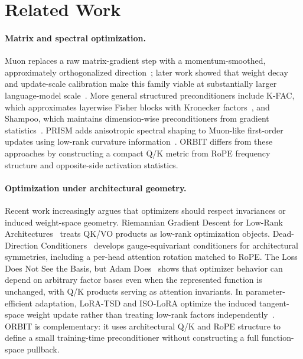 \documentclass[10pt]{article}
\begin{document}
\section{Related Work}
\paragraph{Matrix and spectral optimization.}
Muon replaces a raw matrix-gradient step with a momentum-smoothed, approximately
orthogonalized direction~\cite{jordan2024muon}; later work showed that weight decay and
update-scale calibration make this family viable at substantially larger language-model
scale~\cite{liu2025muon}. More general structured preconditioners include K-FAC, which
approximates layerwise Fisher blocks with Kronecker factors~\cite{martens2015kfac}, and
Shampoo, which maintains dimension-wise preconditioners from gradient statistics~\cite{gupta2018shampoo}.
PRISM adds anisotropic spectral shaping to Muon-like first-order updates using low-rank
curvature information~\cite{yang2026prism}. ORBIT differs from these approaches by
constructing a compact Q/K metric from RoPE frequency structure and opposite-side activation
statistics.

\paragraph{Optimization under architectural geometry.}
Recent work increasingly argues that optimizers should respect invariances or induced
weight-space geometry. Riemannian Gradient Descent for Low-Rank Architectures~\cite{knight2026riemannian}
treats QK/VO products as low-rank optimization objects. Dead-Direction Conditioners~\cite{shirodkar2026dead}
develops gauge-equivariant conditioners for architectural symmetries, including a per-head
attention rotation matched to RoPE. The Loss Does Not See the Basis, but Adam Does~\cite{singh2026basis}
shows that optimizer behavior can depend on arbitrary factor bases even when the represented
function is unchanged, with Q/K products serving as attention invariants. In parameter-efficient
adaptation, LoRA-TSD and ISO-LoRA optimize the induced tangent-space weight update rather
than treating low-rank factors independently~\cite{andriianov2026loratsd,zhu2026isolora}.
ORBIT is complementary: it uses architectural Q/K and RoPE structure to define a small
training-time preconditioner without constructing a full function-space pullback.
\end{document}
